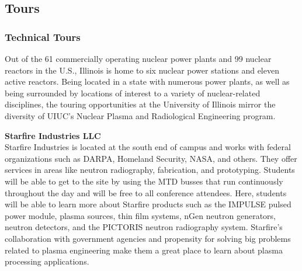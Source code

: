 \subsection{Tours}


\subsubsection{Technical Tours}
Out of the 61 commercially operating nuclear power plants and 99 nuclear reactors in the U.S., Illinois is home to six nuclear power stations and eleven active reactors. Being located in a state with numerous power plants, as well as being surrounded by locations of interest to a variety of nuclear-related disciplines, the touring opportunities at the University of Illinois mirror the diversity of UIUC’s Nuclear Plasma and Radiological Engineering program.



\textbf{Starfire Industries LLC}\\
Starfire Industries is located at the south end of campus and works with federal organizations such as DARPA, Homeland Security, NASA, and others. They offer services in areas like neutron radiography, fabrication, and prototyping. Students will be able to get to the site by using the MTD busses that run continuously throughout the day and will be free to all conference attendees. Here, students will be able to learn more about Starfire products such as the IMPULSE pulsed power module, plasma sources, thin film systems, nGen neutron generators, neutron detectors, and the PICTORIS neutron radiography system. Starfire’s collaboration with government agencies and propensity for solving big problems related to plasma engineering make them a great place to learn about plasma processing applications.\\

